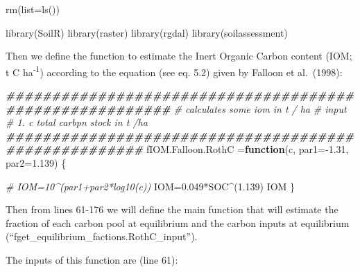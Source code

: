 \documentclass[
  10pt,
  b5paper,
]{book}
\newenvironment{Shaded}{\begin{snugshade}}{\end{snugshade}}
\newcommand{\AttributeTok}[1]{\textcolor[rgb]{0.77,0.63,0.00}{#1}}
\newcommand{\CommentTok}[1]{\textcolor[rgb]{0.56,0.35,0.01}{\textit{#1}}}
\newcommand{\ControlFlowTok}[1]{\textcolor[rgb]{0.13,0.29,0.53}{\textbf{#1}}}
\newcommand{\DocumentationTok}[1]{\textcolor[rgb]{0.56,0.35,0.01}{\textbf{\textit{#1}}}}
\newcommand{\FloatTok}[1]{\textcolor[rgb]{0.00,0.00,0.81}{#1}}
\newcommand{\FunctionTok}[1]{\textcolor[rgb]{0.00,0.00,0.00}{#1}}
\newcommand{\NormalTok}[1]{#1}
\newcommand{\OtherTok}[1]{\textcolor[rgb]{0.56,0.35,0.01}{#1}}
\newcommand{\SpecialCharTok}[1]{\textcolor[rgb]{0.00,0.00,0.00}{#1}}
\begin{document}
\begin{Shaded}
\begin{Highlighting}[]
\FunctionTok{rm}\NormalTok{(}\AttributeTok{list=}\FunctionTok{ls}\NormalTok{()) }

\FunctionTok{library}\NormalTok{(SoilR)}
\FunctionTok{library}\NormalTok{(raster)}
\FunctionTok{library}\NormalTok{(rgdal)}
\FunctionTok{library}\NormalTok{(soilassessment)}
\end{Highlighting}
\end{Shaded}

Then we define the function to estimate the Inert Organic Carbon content (IOM; t C ha\textsuperscript{-1}) according to the equation (see eq. 5.2) given by Falloon et al.~(1998):

\begin{Shaded}
\begin{Highlighting}[]
\DocumentationTok{\#\#\#\#\#\#\#\#\#\#\#\#\#\#\#\#\#\#\#\#\#\#\#\#\#\#\#\#\#\#\#\#\#\#\#\#\#\#\#\#\#\#\#\#\#\#\#\#\#\#\#\#\#\#\#\#}
\CommentTok{\# calculates some iom in t / ha}
\CommentTok{\# input}
\CommentTok{\# 1. c total carbpn stock in t /ha}
\DocumentationTok{\#\#\#\#\#\#\#\#\#\#\#\#\#\#\#\#\#\#\#\#\#\#\#\#\#\#\#\#\#\#\#\#\#\#\#\#\#\#\#\#\#\#\#\#\#\#\#\#\#\#\#\#\#}
\NormalTok{fIOM.Falloon.RothC }\OtherTok{=}\ControlFlowTok{function}\NormalTok{(c, }\AttributeTok{par1=}\SpecialCharTok{{-}}\FloatTok{1.31}\NormalTok{, }\AttributeTok{par2=}\FloatTok{1.139}\NormalTok{)}
\NormalTok{\{}
  
 \CommentTok{\# IOM=10\^{}(par1+par2*log10(c))}
\NormalTok{  IOM}\OtherTok{=}\FloatTok{0.049}\SpecialCharTok{*}\NormalTok{SOC}\SpecialCharTok{\^{}}\NormalTok{(}\FloatTok{1.139}\NormalTok{) }
\NormalTok{  IOM}
\NormalTok{\}}
\end{Highlighting}
\end{Shaded}

Then from lines 61-176 we will define the main function that will estimate the fraction of each carbon pool at equilibrium and the carbon inputs at equilibrium (``fget\_equilibrium\_factions.RothC\_input'').

The inputs of this function are (line 61):
\end{document}
